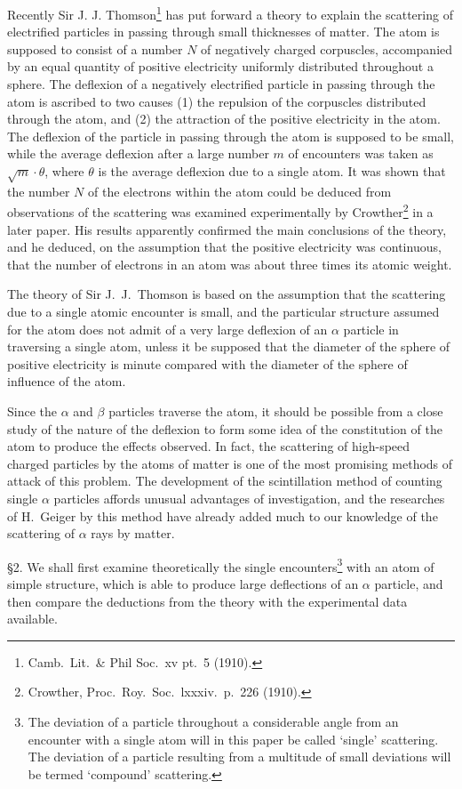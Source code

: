 \documentclass{article}
\begin{document}
\bigskip
Recently Sir J. J. Thomson\footnote{Camb.~Lit.~\& Phil Soc.~xv pt.~5 (1910).}
has put forward a theory to
explain the scattering of electrified particles in passing through small thicknesses of matter.
The atom is supposed to consist of a number $N$ of negatively charged corpuscles, accompanied
by an equal quantity of positive electricity uniformly distributed throughout a sphere.
The deflexion of a negatively electrified particle in passing through the atom is ascribed to two causes
(1) the repulsion of the corpuscles distributed through the atom,
and (2) the attraction of the positive electricity in the atom.
The deflexion of the particle in passing through the atom is supposed to be small,
while the average deflexion after a large number $m$ of encounters was taken as $\sqrt m\cdot\theta$,
where $\theta$ is the average deflexion due to a single atom. It was shown that the number $N$ of the electrons within the atom could be deduced from observations of the scattering was examined experimentally by
Crowther\footnote{Crowther, Proc.~Roy.~Soc.~lxxxiv.~p.~226 (1910).}
in a later paper.
His results apparently confirmed the main conclusions of the theory, and he deduced, on the assumption that the positive electricity was continuous, that the number of electrons in an atom was about three times its atomic weight.

\bigskip
The theory of Sir J.~J.~Thomson is based on the assumption that the scattering due to a single atomic encounter is small,
and the particular structure assumed for the atom does not admit of a very large deflexion of an
$\alpha$ particle in traversing a single atom, unless it be supposed that the diameter of the sphere of positive
electricity is minute compared with the diameter of the sphere of influence of the atom.

\bigskip
Since the $\alpha$ and $\beta$ particles traverse the atom, it should be possible from a close study of the nature
of the deflexion to form some idea of the constitution of the atom to produce the effects observed. In fact,
the scattering of high-speed charged particles by the atoms of matter is one of the most promising methods of attack
of this problem.
The development of the scintillation method of counting single $\alpha$ particles affords unusual advantages of
investigation, and the researches of H.~Geiger by this method have already added much to our knowledge of the
scattering of $\alpha$ rays by matter.

\bigskip
\S 2.
We shall first examine theoretically the single encounters\footnote{The deviation of a particle throughout a considerable angle from an encounter with a single atom will in this paper be called `single' scattering. The deviation of a particle resulting from a multitude of small deviations will be termed `compound' scattering.}
with an atom of simple structure, which is able to
produce large deflections of an $\alpha$ particle, and then compare the deductions from the theory with the
experimental data available.
\end{document}
